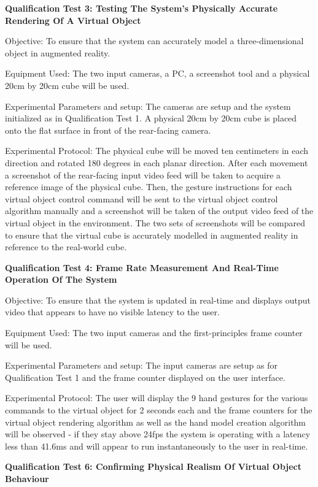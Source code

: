 \textbf{Qualification Test 3: Testing The System's Physically Accurate Rendering Of A Virtual Object}

Objective: To ensure that the system can accurately model a three-dimensional object in augmented reality.

Equipment Used: The two input cameras, a PC, a screenshot tool and a physical 20cm by 20cm cube will be used.

Experimental Parameters and setup: The cameras are setup and the system initialized as in Qualification Test 1. A physical 20cm by 20cm cube is placed onto the flat surface in front of the rear-facing camera.

Experimental Protocol: The physical cube will be moved ten centimeters in each direction and rotated 180 degrees in each planar direction. After each movement a screenshot of the rear-facing input video feed will be taken to acquire a reference image of the physical cube. Then, the gesture instructions for each virtual object control command will be sent to the virtual object control algorithm manually and a screenshot will be taken of the output video feed of the virtual object in the environment. The two sets of screenshots will be compared to ensure that the virtual cube is accurately modelled in augmented reality in reference to the real-world cube.

\textbf{Qualification Test 4: Frame Rate Measurement And Real-Time Operation Of The System}

Objective: To ensure that the system is updated in real-time and displays output video that appears to have no visible latency to the user.

Equipment Used: The two input cameras and the first-principles frame counter will be used.

Experimental Parameters and setup: The input cameras are setup as for Qualification Test 1 and the frame counter displayed on the user interface.

Experimental Protocol: The user will display the 9 hand gestures for the various commands to the virtual object for 2 seconds each and the frame counters for the virtual object rendering algorithm as well as the hand model creation algorithm will be observed - if they stay above 24fps the system is operating with a latency less than 41.6ms and will appear to run instantaneously to the user in real-time.

\textbf{Qualification Test 6: Confirming Physical Realism Of Virtual Object Behaviour}


